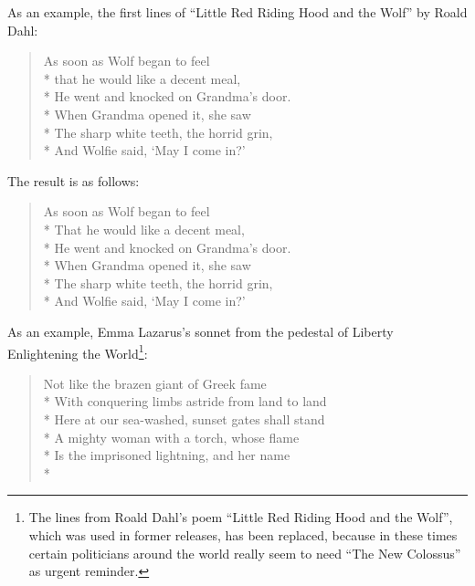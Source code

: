     \begin{Example}
      \iffalse
        As an example, the first lines of ``Little Red Riding Hood and the
        Wolf'' by Roald Dahl:
\begin{lstcode}
  \begin{verse}
    As soon as Wolf began to feel\\*
    that he would like a decent meal,\\*
    He went and knocked on Grandma's door.\\*
    When Grandma opened it, she saw\\*
    The sharp white teeth, the horrid grin,\\*
    And Wolfie said, `May I come in?'
  \end{verse}
\end{lstcode}
        The result is as follows:
        \begin{ShowOutput}
          \begin{verse}
            As soon as Wolf began to feel\\*
            That he would like a decent meal,\\*
            He went and knocked on Grandma's door.\\*
            When Grandma opened it, she saw\\*
            The sharp white teeth, the horrid grin,\\*
            And Wolfie said, `May I come in?'
          \end{verse}
        \end{ShowOutput}
      \else
        As an example, Emma Lazarus's sonnet from the pedestal of Liberty
        Enlightening the World\footnote{The lines from Roald Dahl's poem
          ``Little Red Riding Hood and the Wolf'', which was used in former
          releases, has been replaced, because in these times certain
          politicians around the world really seem to need ``The New
          Colossus'' as urgent reminder.}:
\begin{lstcode}
  \begin{verse}
    Not like the brazen giant of Greek fame\\*
    With conquering limbs astride from land to land\\*
    Here at our sea-washed, sunset gates shall stand\\*
    A mighty woman with a torch, whose flame\\*
    Is the imprisoned lightning, and her name\\*

\end{verse}
\end{lstcode}
\end{Example}
